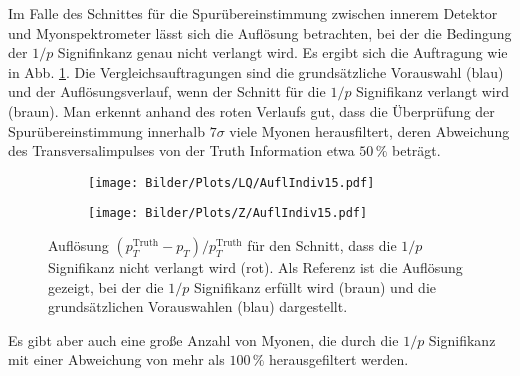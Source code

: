 Im Falle des Schnittes für die Spurübereinstimmung zwischen innerem Detektor und Myonspektrometer lässt sich die Auflösung betrachten, bei der die Bedingung der $1/p$ Signifinkanz genau nicht verlangt wird. Es ergibt sich die Auftragung wie in Abb. \ref{AuflIndiv15LQ}. Die Vergleichsauftragungen sind die grundsätzliche Vorauswahl (blau) und der Auflösungsverlauf, wenn der Schnitt für die $1/p$ Signifikanz verlangt wird (braun). Man erkennt anhand des roten Verlaufs gut, dass die Überprüfung der Spurübereinstimmung innerhalb $7\sigma$ viele Myonen herausfiltert, deren Abweichung des Transversalimpulses von der Truth Information etwa $50\,\%$ beträgt.
\begin{figure}
  \begin{subfigure}[t]{0.55\textwidth}
  \texttt{[image: Bilder/Plots/LQ/AuflIndiv15.pdf]}
  \label{AuflIndiv15LQ}
  \end{subfigure}
\begin{subfigure}[t]{0.55\textwidth}
 \texttt{[image: Bilder/Plots/Z/AuflIndiv15.pdf]}
  \label{AuflIndiv15Z}
\end{subfigure}
\caption{Auflösung $(p_T^{\text{Truth}}-p_T)/p_T^{\text{Truth}}$ für den Schnitt, dass die $1/p$ Signifikanz nicht verlangt wird (rot). Als Referenz ist die Auflösung gezeigt, bei der die $1/p$ Signifikanz erfüllt wird (braun) und die grundsätzlichen Vorauswahlen (blau) dargestellt.}
\label{AuflIndiv15}
\end{figure} 
Es gibt aber auch eine große Anzahl von Myonen, die durch die $1/p$ Signifikanz mit einer Ab\-wei\-chung von mehr als $100\,\%$ herausgefiltert werden.

